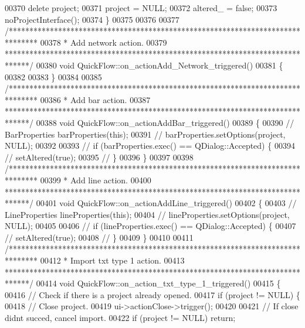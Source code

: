 \begin{DoxyCode}
00370   \textcolor{keyword}{delete} project;
00371   project = NULL;
00372   altered\_ = \textcolor{keyword}{false};
00373   noProjectInterface();
00374 \}
00375 
00376 
00377 \textcolor{comment}{/*******************************************************************************}
00378 \textcolor{comment}{* Add network action.}
00379 \textcolor{comment}{******************************************************************************/}
00380 \textcolor{keywordtype}{void} QuickFlow::on\_actionAdd\_Network\_triggered()
00381 \{
00382 
00383 \}
00384 
00385 \textcolor{comment}{/*******************************************************************************}
00386 \textcolor{comment}{ * Add bar action.}
00387 \textcolor{comment}{ ******************************************************************************/}
00388 \textcolor{keywordtype}{void} QuickFlow::on\_actionAddBar\_triggered()
00389 \{
00390 \textcolor{comment}{//  BarProperties barProperties(this);}
00391 \textcolor{comment}{//  barProperties.setOptions(project, NULL);}
00392 
00393 \textcolor{comment}{//  if (barProperties.exec() == QDialog::Accepted) \{}
00394 \textcolor{comment}{//    setAltered(true);}
00395 \textcolor{comment}{//  \}}
00396 \}
00397 
00398 \textcolor{comment}{/*******************************************************************************}
00399 \textcolor{comment}{ * Add line action.}
00400 \textcolor{comment}{ ******************************************************************************/}
00401 \textcolor{keywordtype}{void} QuickFlow::on\_actionAddLine\_triggered()
00402 \{
00403 \textcolor{comment}{//  LineProperties lineProperties(this);}
00404 \textcolor{comment}{//  lineProperties.setOptions(project, NULL);}
00405 
00406 \textcolor{comment}{//  if (lineProperties.exec() == QDialog::Accepted) \{}
00407 \textcolor{comment}{//    setAltered(true);}
00408 \textcolor{comment}{//  \}}
00409 \}
00410 
00411 \textcolor{comment}{/*******************************************************************************}
00412 \textcolor{comment}{ * Import txt type 1 action.}
00413 \textcolor{comment}{ ******************************************************************************/}
00414 \textcolor{keywordtype}{void} QuickFlow::on\_action\_txt\_type\_1\_triggered()
00415 \{
00416 \textcolor{comment}{// Check if there is a project already opened.}
00417   \textcolor{keywordflow}{if} (project != NULL) \{
00418     \textcolor{comment}{// Close project.}
00419     ui->actionClose->trigger();
00420 
00421     \textcolor{comment}{// If close didnt succed, cancel import.}
00422     \textcolor{keywordflow}{if} (project != NULL) \textcolor{keywordflow}{return};

\end{DoxyCode}
